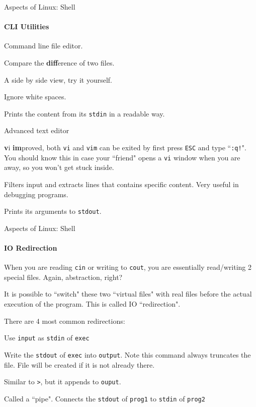 \begin{frame}{Aspects of Linux: Shell}
\framesubtitle{CLI Utilities}
\begin{description}[vi/vim]
	\item[nano] Command line file editor.
	\item[diff] Compare the \textbf{diff}erence of two files. 
	\begin{description}[-]
		\small
		\item[-y] A side by side view, try it yourself.
		\item[-w] Ignore white spaces.  
	\end{description}
	\item[less] Prints the content from its \texttt{stdin} in a readable way.
	\item[vi] Advanced text editor
	\item[vim] \textbf{v}i \textbf{im}proved, both \texttt{vi} and \texttt{vim} can be exited by first press \texttt{ESC} and type ``\texttt{:q!}". You should know this in case your ``friend" opens a \texttt{vi} window when you are away, so you won't get stuck inside.
	\item[grep] Filters input and extracts lines that contains specific content. Very useful in debugging programs. 
	\item[echo] Prints its arguments to \texttt{stdout}.
\end{description}

\end{frame}

\begin{frame}{Aspects of Linux: Shell}
\framesubtitle{IO Redirection}
When you are reading \texttt{cin} or writing to \texttt{cout}, you are essentially read/writing 2 special files. Again, abstraction, right? 

It is possible to ``switch" these two ``virtual files" with real files before the actual execution of the program. This is called IO ``redirection".

There are 4 most common redirections:

\begin{description}
	\item[\texttt{exec < input}] Use \texttt{input} as \texttt{stdin} of \texttt{exec}
	\item[\texttt{exec > output}] Write the \texttt{stdout} of \texttt{exec}  into \texttt{output}. Note this command always truncates the file. File will be created if it is not already there.
	\item[\texttt{exec >> output}] Similar to \texttt{>}, but it appends to \texttt{ouput}.
	\item[\texttt{prog1 | prog2}] Called a ``pipe". Connects the \texttt{stdout} of \texttt{prog1} to \texttt{stdin} of \texttt{prog2}
\end{description}
\end{frame}

